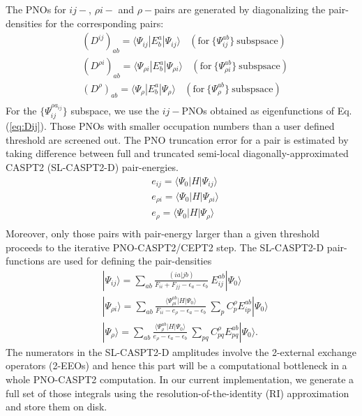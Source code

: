 \documentclass[aip,jcp,amsmath]{revtex4-1}
\begin{document}
%
The PNOs for $ij-$, $\rho i-$ and $\rho-$pairs are generated by diagonalizing the pair-densities for the corresponding pairs:
%
\begin{align}
  &(D^{ij})_{ab}    =\langle\Psi_{ij}    |E^a_b|\Psi_{ij}    \rangle \ \ \ \ (\text{for}\ \{\Psi_{ij}^{ab}\}\ \text{subspsace}) \label{eq:Dij}\\
  &(D^{\rho i})_{ab}=\langle\Psi_{\rho i}|E^a_b|\Psi_{\rho i}\rangle \ \ \ \ (\text{for}\ \{\Psi_{\rho i}^{ab}\}\ \text{subspsace})\\
  &(D^{\rho})_{ab}  =\langle\Psi_{\rho}  |E^a_b|\Psi_{\rho}  \rangle \ \ \ \ (\text{for}\ \{\Psi_{\rho}^{ab}\}\ \text{subspsace})\\  
\end{align}
%
For the $\{\Psi_{ij}^{\rho a_{ij}}\}$ subspace, we use the $ij-$PNOs obtained as eigenfunctions of Eq. (\ref{eq:Dij}).
%
Those PNOs with smaller occupation numbers than a user defined threshold are screened out.
%
The PNO truncation error for a pair is estimated by taking difference between full and truncated semi-local diagonally-approximated CASPT2 (SL-CASPT2-D) pair-energies.
%
\begin{align}
  &e_{ij}=\langle\Psi_0|H|\Psi_{ij}\rangle \\
  &e_{\rho i}=\langle\Psi_0|H|\Psi_{\rho i}\rangle \\
  &e_{\rho}=\langle\Psi_0|H|\Psi_{\rho}\rangle \\  
\end{align}
%
Moreover, only those pairs with pair-energy larger than a given threshold proceeds to the iterative PNO-CASPT2/CEPT2 step.
%
The SL-CASPT2-D pair-functions are used for defining the pair-densities
%
\begin{align}
  &|\Psi_{ij}\rangle=\sum_{ab}\frac{(ia|jb)}{F_{ii}+F_{jj}-\epsilon_a-\epsilon_b}\ E_{ij}^{ab}|\Psi_0\rangle \\
  &|\Psi_{\rho i}\rangle=\sum_{ab}\frac{\langle\Psi_{\rho i}^{ab}|H|\Psi_0\rangle}{F_{ii}-e_\rho-\epsilon_a-\epsilon_b}\ \sum_{p} C_p^\rho E_{ip}^{ab}|\Psi_0\rangle \\
  &|\Psi_{\rho}\rangle=\sum_{ab}\frac{\langle\Psi_{\rho}^{ab}|H|\Psi_0\rangle}{e_\rho-\epsilon_a-\epsilon_b}\ \sum_{pq} C_{pq}^\rho E_{pq}^{ab}|\Psi_0\rangle.
\end{align}
%
The numerators in the SL-CASPT2-D amplitudes involve the 2-external exchange operators (2-EEOs) and hence this part will be a computational bottleneck in a whole PNO-CASPT2 computation.
%
In our current implementation, we generate a full set of those integrals using the resolution-of-the-identity (RI) approximation\cite{Feyereisen1993_2} and store them on disk.
\end{document}
